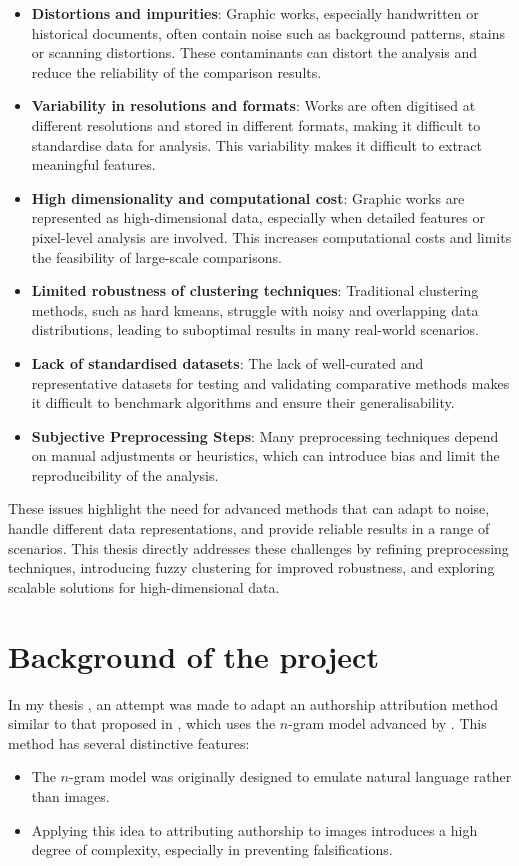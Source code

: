 \begin{toReview}
		\begin{itemize}
			\item \textbf{Distortions and impurities}: Graphic works, especially handwritten or historical documents, often contain noise such as background patterns, stains or scanning distortions. These contaminants can distort the analysis and reduce the reliability of the comparison results.
			\item \textbf{Variability in resolutions and formats}: Works are often digitised at different resolutions and stored in different formats, making it difficult to standardise data for analysis. This variability makes it difficult to extract meaningful features.
			\item \textbf{High dimensionality and computational cost}: Graphic works are represented as high-dimensional data, especially when detailed features or pixel-level analysis are involved. This increases computational costs and limits the feasibility of large-scale comparisons.
			\item \textbf{Limited robustness of clustering techniques}: Traditional clustering methods, such as hard \gls{kmeans}, struggle with noisy and overlapping data distributions, leading to suboptimal results in many real-world scenarios.
			\item \textbf{Lack of standardised datasets}: The lack of well-curated and representative datasets for testing and validating comparative methods makes it difficult to benchmark algorithms and ensure their generalisability.
			\item \textbf{Subjective Preprocessing Steps}: Many preprocessing techniques depend on manual adjustments or heuristics, which can introduce bias and limit the reproducibility of the analysis.
		\end{itemize}

		\noindent These issues highlight the need for advanced methods that can adapt to noise, handle different data representations, and provide reliable results in a range of scenarios. This thesis directly addresses these challenges by refining preprocessing techniques, introducing fuzzy clustering for improved robustness, and exploring scalable solutions for high-dimensional data.

	\section{Background of the project}
		In my thesis \cite{thesis}, an attempt was made to adapt an authorship attribution method similar to that proposed in \cite{SapAttribution}, which uses the $n$-gram model advanced by \citet{Shannon_ngrammodel}. This method has several distinctive features:
		\begin{itemize}
			\item The $n$-gram model was originally designed to emulate natural language rather than images.
			\item Applying this idea to attributing authorship to images introduces a high degree of complexity, especially in preventing falsifications.
		\end{itemize}


\end{toReview}
